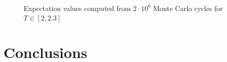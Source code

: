 \documentclass[10pt,showpacs,preprintnumbers,amsmath,amssymb,nofootinbib,aps,prl,twocolumn,groupedaddress,superscriptaddress,showkeys]{revtex4-1}
\begin{document}
  \begin{figure}[h!p]
    \center
    \\
    \\
    \\
    \caption{\label{fig:phase transitions} Expectation values computed from $2\cdot10^6$ Monte Carlo cycles for $T \in [2, 2.3]$}
  \end{figure}

  



\section{Conclusions}


\end{document}
